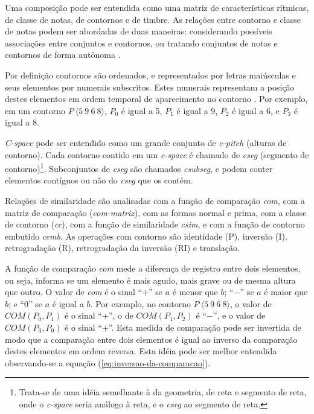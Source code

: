 \documentclass{article}
\newcommand{\eng}[1]{\textit{#1}}
\begin{document}
Uma composição pode ser entendida como uma matriz de características
rítmicas, de classe de notas, de contornos e de timbre. As relações
entre contorno e classe de notas podem ser abordadas de duas maneiras:
considerando possíveis associações entre conjuntos e contornos, ou
tratando conjuntos de notas e contornos de forma autônoma
\cite{friedmann85:methodology}.

Por definição contornos são ordenados, e representados por letras
maiúsculas e seus elementos por numerais subscritos. Estes numerais
representam a posição destes elementos em ordem temporal de
aparecimento no contorno \cite{marvin.ea87:relating}. Por exemplo, em
um contorno $P\:\langle5\:9\:6\:8\rangle$, $P_0$ é igual a 5, $P_1$ é
igual a 9, $P_2$ é igual a 6, e $P_3$ é igual a 8.

\eng{C-space} pode ser entendido como um grande conjunto de
\eng{c-pitch} (alturas de contorno). Cada contorno contido em um
\eng{c-space} é chamado de \eng{cseg} (segmento de
contorno)\footnote{Trata-se de uma idéia semelhante à da geometria, de
  reta e segmento de reta, onde o \eng{c-space} seria análogo à reta,
  e o \eng{cseg} ao segmento de reta.}. Subconjuntos de \eng{cseg} são
chamados \eng{csubseg}, e podem conter elementos contíguos ou não do
\eng{cseg} que os contém.

Relações de similaridade \cite{marvin.ea87:relating} são analisadas
com a função de comparação \eng{com}, com a matriz de comparação
(\eng{com-matrix}), com as formas normal e prima, com a classe de
contorno (\eng{cc}), com a função de similaridade \eng{csim}, e com a
função de contorno embutido \eng{cemb}. As operações com contorno são
identidade (P), inversão (I), retrogradação (R), retrogradação da
inversão (RI) e translação.

A função de comparação \eng{com} mede a diferença de registro entre
dois elementos, ou seja, informa se um elemento é mais agudo, mais
grave ou de mesma altura que outro. O valor de \eng{com} é o sinal
``$+$'' se $a$ é menor que $b$; ``$-$'' se $a$ é maior que $b$; e
``$0$'' se $a$ é igual a $b$. Por exemplo, no contorno
$P\:\langle5\:9\:6\:8\rangle$, o valor de $COM(P_0,P_1)$ é o sinal
``$+$'', o de $COM(P_1,P_2)$ é ``$-$'', e o valor de $COM(P_3,P_0)$ é
o sinal ``$+$''. Esta medida de comparação pode ser invertida de modo
que a comparação entre dois elementos é igual ao inverso da comparação
destes elementos em ordem reversa. Esta idéia pode ser melhor
entendida observando-se a equação (\ref{eq:inversao-da-comparacao}).
\end{document}
